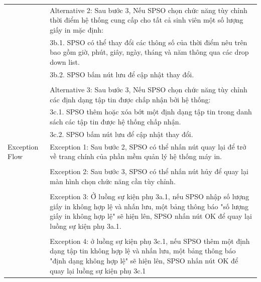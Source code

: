 \begin{enumerate}[a)]
\begin{longtable}{|l|p{10cm}|}
        &Alternative 2: Sau bước 3, Nếu SPSO chọn chức năng tùy chỉnh thời điểm hệ thống cung cấp cho tất cả sinh viên một số lượng giấy in mặc định:\\
        & \hspace{1em} 3b.1. SPSO có thể thay đổi các thông số của thời điểm nêu trên bao gồm giờ, phút, giây, ngày, tháng và năm thông qua các drop down list.\\
        & \hspace{1em} 3b.2. SPSO bấm nút lưu để cập nhật thay đổi.\\
        &\\
        &Alternative 3: Sau bước 3, Nếu SPSO chọn chức năng tùy chỉnh các định dạng tập tin được chấp nhận bởi hệ thống:\\
        & \hspace{1em} 3c.1. SPSO thêm hoặc xóa bớt một định dạng tập tin trong danh sách các tập tin được hệ thống chấp nhận.\\
        & \hspace{1em} 3c.2. SPSO bấm nút lưu để cập nhật thay đổi.\\
        \hline
        Exception Flow & Exception 1: Sau bước 2, SPSO có thể nhấn nút quay lại để trở về trang chính của phần mềm quản lý hệ thống máy in.\\
        &\\
        & Exception 2: Sau bước 3, SPSO có thể nhấn nút hủy để quay lại màn hình chọn chức năng cần tùy chỉnh.\\
        &\\
        & Exception 3: Ở luồng sự kiện phụ 3a.1, nếu SPSO nhập số lượng giấy in không hợp lệ và nhấn lưu, một bảng thông báo "số lượng giấy in không hợp lệ" sẽ hiện lên, SPSO nhấn nút OK để quay lại luồng sự kiện phụ 3a.1.\\
        &\\
        & Exception 4: ở luồng sự kiện phụ 3c.1, nếu SPSO thêm một định dạng tập tin không hợp lệ và nhấn lưu, một bảng thông báo "định dạng không hợp lệ" sẽ hiện lên, SPSO nhấn nút OK để quay lại luồng sự kiện phụ 3c.1\\
    \end{longtable}


\end{enumerate}
